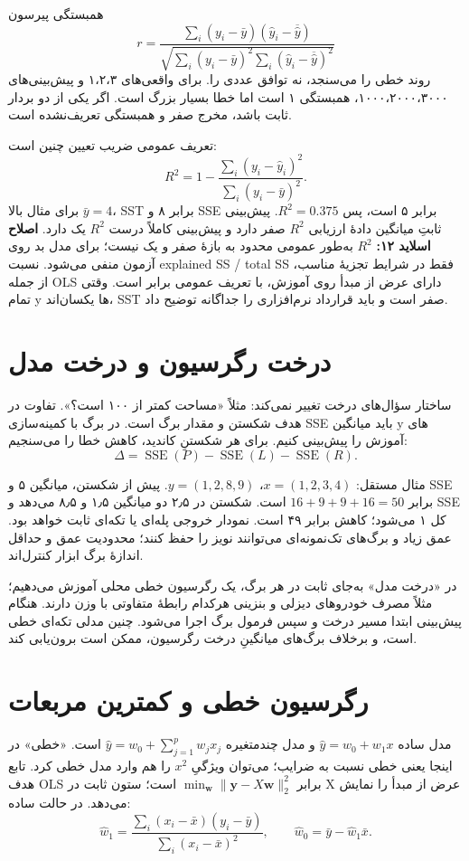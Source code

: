 همبستگی پیرسون \[
r=\frac{\sum_i(y_i-\bar y)(\widehat y_i-\overline{\widehat y})}{\sqrt{\sum_i(y_i-\bar y)^2\sum_i(\widehat y_i-\overline{\widehat y})^2}}
\] روند خطی را می‌سنجد، نه توافق عددی را. برای واقعی‌های ۱،۲،۳ و پیش‌بینی‌های ۱۰۰۰،۲۰۰۰،۳۰۰۰، همبستگی ۱ است اما خطا بسیار بزرگ است. اگر یکی از دو بردار ثابت باشد، مخرج صفر و همبستگی تعریف‌نشده است.

تعریف عمومی ضریب تعیین چنین است: \[
R^2=1-\frac{\sum_i(y_i-\widehat y_i)^2}{\sum_i(y_i-\bar y)^2}.
\] برای مثال بالا \(\bar y=4\)، SST برابر ۸ و SSE برابر ۵ است، پس \(R^2=0.375\). پیش‌بینی ثابتِ میانگین دادهٔ ارزیابی $R^2$ صفر دارد و پیش‌بینی کاملاً درست $R^2$ یک دارد. \textbf{اصلاح اسلاید ۱۲:} $R^2$ به‌طور عمومی محدود به بازهٔ صفر و یک نیست؛ برای مدل بد روی آزمون منفی می‌شود. نسبت explained SS / total SS فقط در شرایط تجزیهٔ مناسب، از جمله OLS دارای عرض از مبدأ روی آموزش، با تعریف عمومی برابر است. وقتی تمام y ها یکسان‌اند، SST صفر است و باید قرارداد نرم‌افزاری را جداگانه توضیح داد.

\section{درخت رگرسیون و درخت مدل}

ساختار سؤال‌های درخت تغییر نمی‌کند: مثلاً «مساحت کمتر از ۱۰۰ است؟». تفاوت در هدف شکستن و مقدار برگ است. در برگ با کمینه‌سازی SSE باید میانگین y های آموزش را پیش‌بینی کنیم. برای هر شکستنِ کاندید، کاهش خطا را می‌سنجیم: \[
\Delta=\operatorname{SSE}(P)-\operatorname{SSE}(L)-\operatorname{SSE}(R).
\]

مثال مستقل: \(x=(1,2,3,4)\)، \(y=(1,2,8,9)\). پیش از شکستن، میانگین ۵ و SSE برابر \(16+9+9+16=50\) است. شکستن در ۲٫۵ دو میانگین ۱٫۵ و ۸٫۵ می‌دهد و SSE کل ۱ می‌شود؛ کاهش برابر ۴۹ است. نمودار خروجی پله‌ای یا تکه‌ای ثابت خواهد بود. عمق زیاد و برگ‌های تک‌نمونه‌ای می‌توانند نویز را حفظ کنند؛ محدودیت عمق و حداقل اندازهٔ برگ ابزار کنترل‌اند.

در «درخت مدل» به‌جای ثابت در هر برگ، یک رگرسیون خطی محلی آموزش می‌دهیم؛ مثلاً مصرف خودروهای دیزلی و بنزینی هرکدام رابطهٔ متفاوتی با وزن دارند. هنگام پیش‌بینی ابتدا مسیر درخت و سپس فرمول برگ اجرا می‌شود. چنین مدلی تکه‌ای خطی است، و برخلاف برگ‌های میانگینِ درخت رگرسیون، ممکن است برون‌یابی کند.

\section{رگرسیون خطی و کمترین مربعات}

مدل ساده \(\widehat y=w_0+w_1x\) و مدل چندمتغیره \(\widehat y=w_0+\sum_{j=1}^p w_jx_j\) است. «خطی» در اینجا یعنی خطی نسبت به ضرایب؛ می‌توان ویژگیِ \(x^2\) را هم وارد مدل خطی کرد. تابع هدف OLS برابر \(\min_{\boldsymbol w}\|\boldsymbol y-X\boldsymbol w\|_2^2\) است؛ ستون ثابت در X عرض از مبدأ را نمایش می‌دهد. در حالت ساده: \[
\widehat w_1=\frac{\sum_i(x_i-\bar x)(y_i-\bar y)}{\sum_i(x_i-\bar x)^2},
\qquad \widehat w_0=\bar y-\widehat w_1\bar x.
\]

